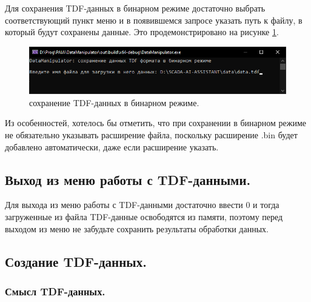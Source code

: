 {\standartFont

  \par Для сохранения TDF-данных в бинарном режиме достаточно выбрать соответствующий пункт меню и в появившемся запросе указать путь к файлу, в который будут сохранены данные. Это продемонстрировано на рисунке \ref{fig:TDFsafeBIN}.

  \begin{figure}[H]
    \centering
    \includegraphics[width=\textwidth]{images/forDataManipulator/TDFsafeBIN.png}
    \caption{сохранение TDF-данных в бинарном режиме.}
    \label{fig:TDFsafeBIN}
  \end{figure}

  \par Из особенностей, хотелось бы отметить, что при сохранении в бинарном режиме не обязательно указывать расширение файла, поскольку расширение .bin будет добавлено автоматически, даже если расширение указать.
}

\subsection{ \standartTitleFont
  Выход из меню работы с TDF-данными.
} \label{subsubsec:TDFOut}

{\standartFont

  \par Для выхода из меню работы с TDF-данными достаточно ввести 0 и тогда загруженные из файла TDF-данные освободятся из памяти, поэтому перед выходом из меню не забудьте сохранить результаты обработки данных.

  \par
}

\subsection{ \standartTitleFont
  Создание TDF-данных.
} \label{subsubsec:CreateTDF}

\subsubsection{ \standartTitleFont
  Смысл TDF-данных.
} \label{subsubsec:CreateTDFTarget}

